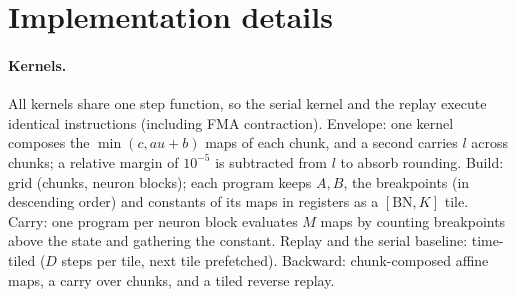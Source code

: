 \documentclass[10pt]{article}
\theoremstyle{remark}
\begin{document}
\begin{table}[!htbp]
\centering\small

\caption{ALIF: exact number of pieces of the post-reset map $\Psi_0$ (mean and max over 20 random inputs, rational arithmetic) and the upper bound $1+\sum_k|\Psi_k|$ on the pieces of the full segment map $\Phi$ at $L=64$.}
\label{tab:alifexact}
\end{table}

\section{Implementation details}
\label{app:impl}

\paragraph{Kernels.} All kernels share one step function, so the serial kernel and the replay execute identical instructions (including FMA contraction). Envelope: one kernel composes the $\min(c,au+b)$ maps of each chunk, and a second carries $l$ across chunks; a relative margin of $10^{-5}$ is subtracted from $l$ to absorb rounding. Build: grid (chunks, neuron blocks); each program keeps $A,B$, the breakpoints (in descending order) and constants of its maps in registers as a $[\text{BN},K]$ tile. Carry: one program per neuron block evaluates $M$ maps by counting breakpoints above the state and gathering the constant. Replay and the serial baseline: time-tiled ($D$ steps per tile, next tile prefetched). Backward: chunk-composed affine maps, a carry over chunks, and a tiled reverse replay.
\end{document}
